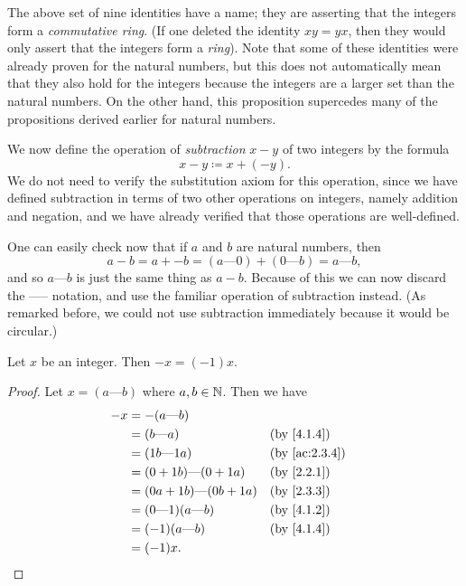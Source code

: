 \begin{rmk}\label{4.1.7}
  The above set of nine identities have a name; they are asserting that the integers form a \emph{commutative ring}.
  (If one deleted the identity \(xy = yx\), then they would only assert that the integers form a \emph{ring}).
  Note that some of these identities were already proven for the natural numbers, but this does not automatically mean that they also hold for the integers because the integers are a larger set than the natural numbers.
  On the other hand, this proposition supercedes many of the propositions derived earlier for natural numbers.
\end{rmk}

\begin{note}
  We now define the operation of \emph{subtraction} \(x - y\) of two integers by the formula
  \[
    x - y \coloneqq x + (-y).
  \]
  We do not need to verify the substitution axiom for this operation, since we have defined subtraction in terms of two other operations on integers, namely addition and negation, and we have already verified that those operations are well-defined.
\end{note}

\begin{note}
  One can easily check now that if \(a\) and \(b\) are natural numbers, then
  \[
    a - b = a + -b = (a \text{---} 0) + (0 \text{---} b) = a \text{---} b,
  \]
  and so \(a \text{---} b\) is just the same thing as \(a - b\).
  Because of this we can now discard the ----- notation, and use the familiar operation of subtraction instead.
  (As remarked before, we could not use subtraction immediately because it would be circular.)
\end{note}

\begin{ac}\label{ac:4.1.3}
  Let \(x\) be an integer.
  Then \(-x = (-1)x\).
\end{ac}

\begin{proof}
  Let \(x = (a \text{---} b)\) where \(a, b \in \mathbb{N}\).
  Then we have
  \begin{align*}
    -x & = -(a \text{---} b)                                                 \\
       & = (b \text{---} a)                 &  & \text{(by \cref{4.1.4})}    \\
       & = (1b \text{---} 1a)               &  & \text{(by \cref{ac:2.3.4})} \\
       & = (0 + 1b) \text{---} (0 + 1a)     &  & \text{(by \cref{2.2.1})}    \\
       & = (0a + 1b) \text{---} (0b + 1a)   &  & \text{(by \cref{2.3.3})}    \\
       & = (0 \text{---} 1)(a \text{---} b) &  & \text{(by \cref{4.1.2})}    \\
       & = (-1)(a \text{---} b)             &  & \text{(by \cref{4.1.4})}    \\
       & = (-1)x.
  \end{align*}
\end{proof}

